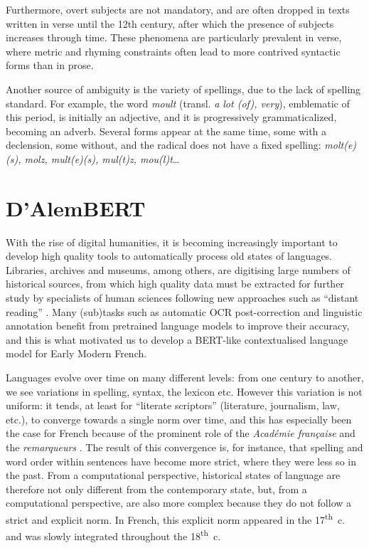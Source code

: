 Furthermore, overt subjects are not mandatory, and are often dropped in texts written in verse until the 12th century, after which the presence of subjects increases through time.
These phenomena are particularly prevalent in verse, where metric and rhyming constraints often lead to more contrived syntactic forms than in prose.

Another source of ambiguity is the variety of spellings, due to the lack of spelling standard. For example, the word \textit{moult} (transl. \textit{a lot (of), very}), emblematic of this period, is initially an adjective, and it is progressively grammaticalized, becoming an adverb. Several forms appear at the same time, some with a declension, some without, and the radical does not have a fixed spelling: \textit{molt(e)(s), molz, mult(e)(s), mul(t)z, mou(l)t}…

\section{D'AlemBERT}

With the rise of digital humanities, it is becoming increasingly important to develop high quality tools to automatically process old states of languages. Libraries, archives and museums, among others, are digitising large numbers of historical sources, from which high quality data must be extracted for further study by specialists of human sciences following new approaches such as ``distant reading'' \cite{moretti-2013-distant}. Many (sub)tasks such as automatic OCR post-correction \cite{rijhwani-etal-2021-lexically} and linguistic annotation \cite{camps-etal-2021-corpus} benefit from pretrained language models to improve their accuracy, and this is what motivated us to develop a BERT-like \cite{devlin-etal-2019-bert} contextualised language model for Early Modern French.

Languages evolve over time on many different levels: from one century to another, we see variations in spelling, syntax, the lexicon etc. However this variation is not uniform: it tends, at least for ``literate scriptors'' (literature, journalism, law, etc.), to converge towards a single norm over time, and this has especially been the case for French because of the prominent role of the \emph{Académie française} and the \emph{remarqueurs} \cite{ayres-bennett-etal-2011-remarques}. The result of this convergence is, for instance, that spelling and word order within sentences have become more strict, where they were less so in the past. From a computational perspective, historical states of language are therefore not only different from the contemporary state, but, from a computational perspective, are also more complex because they do not follow a strict and explicit norm. In French, this explicit norm  appeared in the 17\textsuperscript{th}~c. and was slowly integrated throughout the 18\textsuperscript{th}~c.


